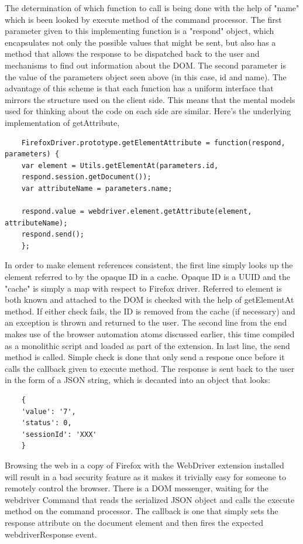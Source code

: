 \documentclass[article,type=msc,colorback,accentcolor=tud9c,twoside,11pt]{tudthesis}
\begin{document}
	The determination of which function to call is being done with the help of "name" which is been looked by execute method of the command processor. The first parameter given to this implementing function is a "respond" object, which encapsulates not only the possible values that might be sent, but also has a method that allows the response to be dispatched back to the user and mechanisms to find out information about the DOM. The second parameter is the value of the parameters object seen above (in this case, id and name). The advantage of this scheme is that each function has a uniform interface that mirrors the structure used on the client side. This means that the mental models used for thinking about the code on each side are similar. Here's the underlying implementation of getAttribute,
	
	\begin{lstlisting}
	FirefoxDriver.prototype.getElementAttribute = function(respond, parameters) {
	var element = Utils.getElementAt(parameters.id,
	respond.session.getDocument());
	var attributeName = parameters.name;
	
	respond.value = webdriver.element.getAttribute(element, attributeName);
	respond.send();
	};
	\end{lstlisting}
	
	In order to make element references consistent, the first line simply looks up the element referred to by the opaque ID in a cache. Opaque ID is a UUID and the "cache" is simply a map with respect to Firefox driver. Referred to element is both known and attached to the DOM is checked with the help of getElementAt method. If either check fails, the ID is removed from the cache (if necessary) and an exception is thrown and returned to the user.
	The second line from the end makes use of the browser automation atoms discussed earlier, this time compiled as a monolithic script and loaded as part of the extension.
	In last line, the send method is called. Simple check is done that only send a respone once before it calls the callback given to execute method. The response is sent back to the user in the form of a JSON string, which is decanted into an object that looks:
	\begin{lstlisting}
	{
	'value': '7',
	'status': 0,
	'sessionId': 'XXX'
	}
	\end{lstlisting}
	Browsing the web in a copy of Firefox with the WebDriver extension installed will result in a bad security feature as it makes it trivially easy for someone to remotely control the browser.
	There is a DOM messenger, waiting for the webdriver Command that reads the serialized JSON object and calls the execute method on the command processor. The callback is one that simply sets the response attribute on the document element and then fires the expected webdriverResponse event.
	
\end{document}
